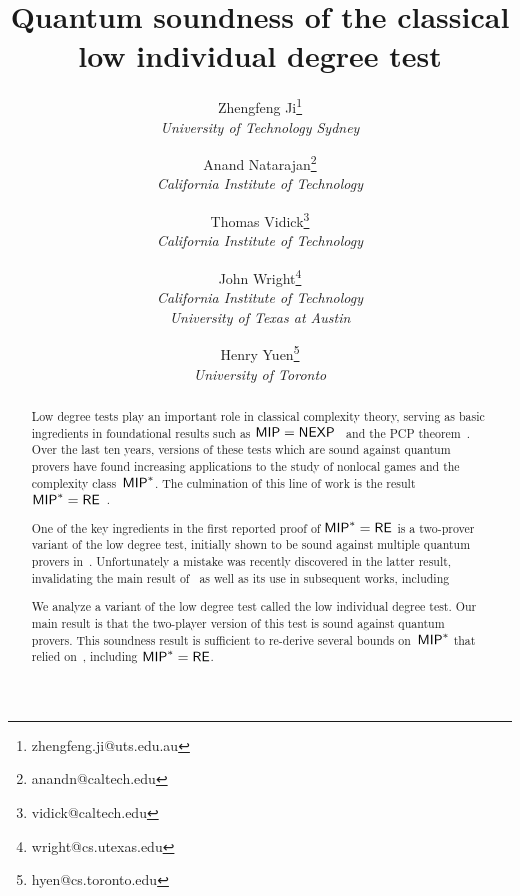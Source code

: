 \documentclass[11pt]{article}
\title{Quantum soundness of the classical low individual degree test}
\author{
Zhengfeng Ji\thanks{zhengfeng.ji@uts.edu.au}\\
\small{\sl University of Technology Sydney}
\and Anand Natarajan\thanks{anandn@caltech.edu}\\
 \small{\sl California Institute of Technology}
 \and Thomas Vidick\thanks{vidick@caltech.edu}\\
 \small{\sl California Institute of Technology}
 \and John Wright\thanks{wright@cs.utexas.edu}\\
 \small{\sl California Institute of Technology}\\
 \small{\sl University of Texas at Austin}
 \and Henry Yuen\thanks{hyen@cs.toronto.edu}\\
 \small{\sl University of Toronto}\vspace*{10pt}
}
\date{}
\begin{document}
\maketitle


\begin{abstract}
Low degree tests play an important role in classical complexity theory,
serving as basic ingredients in foundational results such as $\mathsf{MIP} = \mathsf{NEXP}$~\cite{BFL91}
and the PCP theorem~\cite{AS98,ALM+98}.
Over the last ten years,
versions of these tests which are sound against quantum provers
have found increasing applications to the study of nonlocal games and the complexity class~$\mathsf{MIP}^*$.
The culmination of this line of work is the result $\mathsf{MIP}^* = \mathsf{RE}$~\cite{JNV+20}.


One of the key ingredients in the first reported proof of  $\mathsf{MIP}^* = \mathsf{RE}$ is a two-prover variant of the low degree test, initially  
shown to be sound against multiple quantum provers in~\cite{Vid16}.
Unfortunately a mistake was recently discovered in the latter result, invalidating the main result of~\cite{Vid16} as well as its use in subsequent works, including~\cite{JNV+20}

We analyze a variant of the low degree test called the low individual degree test.
Our main result is that the two-player version of this test is sound against quantum provers. This soundness result is sufficient to re-derive several bounds on~$\mathsf{MIP}^*$ that relied on~\cite{Vid16}, including $\mathsf{MIP}^* = \mathsf{RE}$.
\end{abstract}

\newpage

\tableofcontents
\vfill
\thispagestyle{empty}
\newpage
















\end{document}

